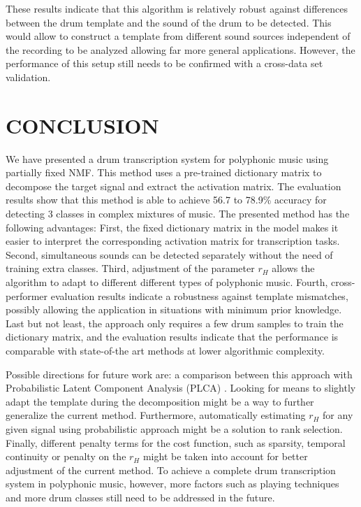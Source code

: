 \documentclass{article}
\begin{document}
These results indicate that this algorithm is relatively robust against differences between the drum template and the sound of the drum to be detected. This would allow to construct a template from different sound sources independent of the recording to be analyzed allowing far more general applications. However, the performance of this setup still needs to be confirmed with a cross-data set validation.

\section{CONCLUSION}\label{sec:Conclusion}

We have presented a drum transcription system for polyphonic music using partially fixed NMF. This method uses a pre-trained dictionary matrix to decompose the target signal and extract the activation matrix. The evaluation results show that this method is able to achieve 56.7 to 78.9\% accuracy for detecting 3 classes in complex mixtures of music. 
The presented method has the following advantages: 
First, the fixed dictionary matrix in the model makes it easier to interpret the corresponding activation matrix for transcription tasks.
Second, simultaneous sounds can be detected separately without the need of training extra classes.  
Third, adjustment of the parameter $r_H$ allows the algorithm to adapt to different different types of polyphonic music. 
Fourth, cross-performer evaluation results indicate a robustness against template mismatches, possibly allowing the application in situations with minimum prior knowledge. 
Last but not least, the approach only requires a few drum samples to train the dictionary matrix, and the evaluation results indicate that the performance is comparable with state-of-the art methods at lower algorithmic complexity. 

Possible directions for future work are: 
a comparison between this approach with Probabilistic Latent Component Analysis (PLCA) \cite{smaragdis_plca_2014}. Looking for means to slightly adapt the template during the decomposition might be a way to further generalize the current method. %
Furthermore, automatically estimating $r_H$ for any given signal using probabilistic approach \cite{ouo_inmf_2010} might be a solution to rank selection. Finally, different penalty terms for the cost function, such as sparsity,  temporal continuity \cite{Virtanen_ssnmf_2007} or penalty on the $r_H$ might be taken into account for better adjustment of the current method. To achieve a complete drum transcription system in polyphonic music, however, more factors such as playing techniques and more drum classes still need to be addressed in the future. 
\end{document}
